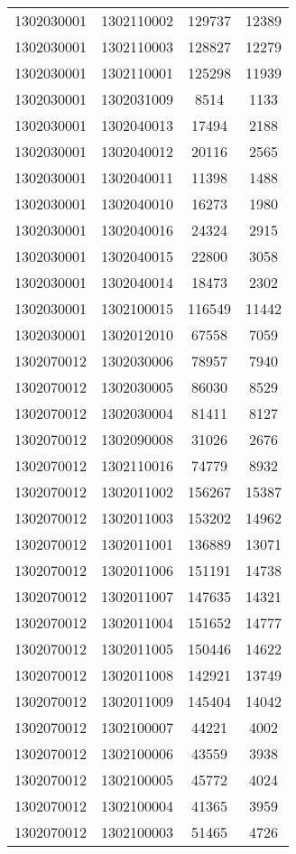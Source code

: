 \begin{longtable}{llcc}
1302030001 & 1302110002 & 129737 & 12389\\
1302030001 & 1302110003 & 128827 & 12279\\
1302030001 & 1302110001 & 125298 & 11939\\
1302030001 & 1302031009 & 8514 & 1133\\
1302030001 & 1302040013 & 17494 & 2188\\
1302030001 & 1302040012 & 20116 & 2565\\
1302030001 & 1302040011 & 11398 & 1488\\
1302030001 & 1302040010 & 16273 & 1980\\
1302030001 & 1302040016 & 24324 & 2915\\
1302030001 & 1302040015 & 22800 & 3058\\
1302030001 & 1302040014 & 18473 & 2302\\
1302030001 & 1302100015 & 116549 & 11442\\
1302030001 & 1302012010 & 67558 & 7059\\
1302070012 & 1302030006 & 78957 & 7940\\
1302070012 & 1302030005 & 86030 & 8529\\
1302070012 & 1302030004 & 81411 & 8127\\
1302070012 & 1302090008 & 31026 & 2676\\
1302070012 & 1302110016 & 74779 & 8932\\
1302070012 & 1302011002 & 156267 & 15387\\
1302070012 & 1302011003 & 153202 & 14962\\
1302070012 & 1302011001 & 136889 & 13071\\
1302070012 & 1302011006 & 151191 & 14738\\
1302070012 & 1302011007 & 147635 & 14321\\
1302070012 & 1302011004 & 151652 & 14777\\
1302070012 & 1302011005 & 150446 & 14622\\
1302070012 & 1302011008 & 142921 & 13749\\
1302070012 & 1302011009 & 145404 & 14042\\
1302070012 & 1302100007 & 44221 & 4002\\
1302070012 & 1302100006 & 43559 & 3938\\
1302070012 & 1302100005 & 45772 & 4024\\
1302070012 & 1302100004 & 41365 & 3959\\
1302070012 & 1302100003 & 51465 & 4726\\

\end{longtable}
